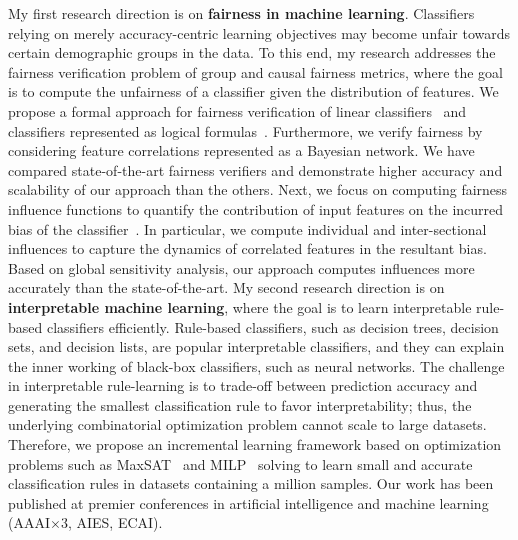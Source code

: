 \documentclass[11pt]{article}
\begin{document}
	My first research direction is on \textbf{fairness in machine learning}. Classifiers relying on merely accuracy-centric learning objectives may become unfair towards certain demographic groups in the data. To this end, my research addresses the fairness verification problem of group and causal fairness metrics, where the goal is to compute the unfairness of a classifier given the distribution of features. We propose a formal approach for fairness verification of linear classifiers~\cite{ghosh2021algorithmic} and classifiers represented as logical formulas~\cite{ghosh2020justicia}. Furthermore, we verify fairness by considering feature correlations represented as a Bayesian network. We have compared state-of-the-art fairness verifiers and demonstrate higher accuracy and scalability of our approach than the others. Next, we focus on computing fairness influence functions to quantify the contribution of input features on the incurred bias of the classifier~\cite{ghosh2021how}. In particular, we compute individual and inter-sectional influences to capture the dynamics of correlated features in the resultant bias. Based on global sensitivity analysis, our approach computes influences more accurately than the state-of-the-art. My second research direction is on \textbf{interpretable machine learning}, where the goal is to learn interpretable rule-based classifiers efficiently. Rule-based classifiers, such as decision trees, decision sets, and decision lists, are popular interpretable classifiers, and they can explain the inner working of black-box classifiers, such as neural networks. The challenge in interpretable rule-learning is to trade-off between prediction accuracy and generating the smallest classification rule to favor interpretability; thus, the underlying combinatorial optimization problem cannot scale to large datasets. Therefore, we propose an incremental learning framework based on optimization problems such as  MaxSAT~\cite{ghosh19incremental,ghosh19efficient,ciampiconi20maxsat} and MILP~\cite{ghosh20classification} solving to learn small and accurate classification rules in datasets containing a million samples. Our work has been published at premier conferences in artificial intelligence and machine learning (AAAI$ \times 3$, AIES, ECAI).
	 
	
	
	
	
\end{document}
